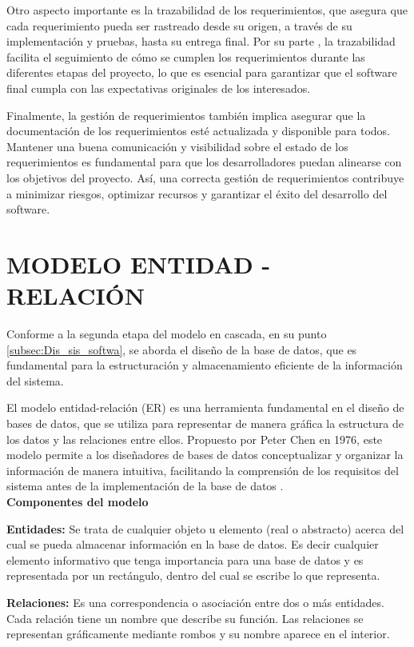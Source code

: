 		Otro aspecto importante es la trazabilidad de los requerimientos, que asegura que cada requerimiento pueda ser rastreado desde su origen, a través de su implementación y pruebas, hasta su entrega final. Por su parte \textcite{sommerville2011introduccion}, la trazabilidad facilita el seguimiento de cómo se cumplen los requerimientos durante las diferentes etapas del proyecto, lo que es esencial para garantizar que el software final cumpla con las expectativas originales de los interesados.
		
		Finalmente, la gestión de requerimientos también implica asegurar que la documentación de los requerimientos esté actualizada y disponible para todos. Mantener una buena comunicación y visibilidad sobre el estado de los requerimientos es fundamental para que los desarrolladores puedan alinearse con los objetivos del proyecto. Así, una correcta gestión de requerimientos contribuye a minimizar riesgos, optimizar recursos y garantizar el éxito del desarrollo del software.
				
	\section{MODELO ENTIDAD - RELACIÓN}
		Conforme a la segunda etapa del modelo en cascada, en su punto \ref{subsec:Dis_sis_softwa}, se aborda el diseño de la base de datos, que es fundamental para la estructuración y almacenamiento eficiente de la información del sistema.
		
		El modelo entidad-relación (ER) es una herramienta fundamental en el diseño de bases de datos, que se utiliza para representar de manera gráfica la estructura de los datos y las relaciones entre ellos. Propuesto por Peter Chen en 1976, este modelo permite a los diseñadores de bases de datos conceptualizar y organizar la información de manera intuitiva, facilitando la comprensión de los requisitos del sistema antes de la implementación de la base de datos \parencite{theentity1976Chen}.\\
		
	\textbf{Componentes del modelo}
		
		\textbf{Entidades:} Se trata de cualquier objeto u elemento (real o abstracto) acerca del cual se pueda almacenar información en la base de datos. Es decir cualquier elemento informativo que tenga importancia para una base de datos y es representada por un rectángulo, dentro del cual se escribe lo que representa.
		
		\textbf{Relaciones:} Es una correspondencia o asociación entre dos o más entidades. Cada relación tiene un nombre que describe su función. Las relaciones se representan gráficamente mediante rombos y su nombre aparece en el interior.
		
